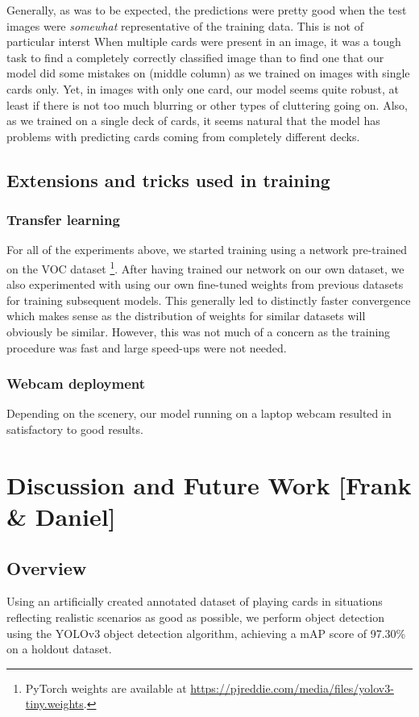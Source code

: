 \documentclass[a4paper]{article}
\begin{document}
Generally, as was to be expected, the predictions were pretty good when the test images were \textit{somewhat} representative of the training data. This is not of particular interst
When multiple cards were present in an image, it was a tough task to find a completely correctly classified image than to find one that our model did some mistakes on (middle column) as we trained on images with single cards only. Yet, in images with only one card, our model seems quite robust, at least if there is not too much blurring or other types of cluttering going on. Also, as we trained on a single deck of cards, it seems natural that the model has problems with predicting cards coming from completely different decks.
\subsection*{Extensions and tricks used in training}
\subsubsection*{Transfer learning}
For all of the experiments above, we started training using a network pre-trained on the VOC dataset \cite{Everingham15} \footnote{PyTorch weights are available at \url{https://pjreddie.com/media/files/yolov3-tiny.weights}.}. After having trained our network on our own dataset, we also experimented with using our own fine-tuned weights from previous datasets for training subsequent models. This generally led to distinctly faster convergence which makes sense as the distribution of weights for similar datasets will obviously be similar. However, this was not much of a concern as the training procedure was fast and large speed-ups were not needed.
\subsubsection*{Webcam deployment}
Depending on the scenery, our model running on a laptop webcam resulted in satisfactory to good results.
\section{Discussion and Future Work [Frank \& Daniel]}
\subsection*{Overview}
Using an artificially created annotated dataset of playing cards in situations reflecting realistic scenarios as good as possible, we perform object detection using the YOLOv3 object detection algorithm, achieving a mAP score of 97.30\% on a holdout dataset. \\ 
\end{document}
